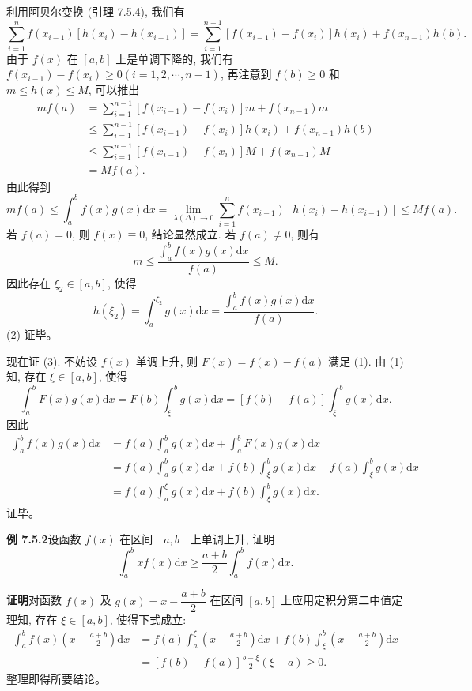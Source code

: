 \documentclass[UTF8,12pt,a4paper,fontset=fandol]{ctexart}
\begin{document}
利用阿贝尔变换 (引理 7.5.4), 我们有
\[
\sum_{i=1}^n f(x_{i-1})[h(x_i)-h(x_{i-1})]
=\sum_{i=1}^{n-1}[f(x_{i-1})-f(x_i)]h(x_i)+f(x_{n-1})h(b).
\]
由于 $f(x)$ 在 $[a,b]$ 上是单调下降的, 我们有 $f(x_{i-1})-f(x_i)\geq0(i=1,2,\cdots,n-1)$, 再注意到 $f(b)\geq0$ 和 $m\leq h(x)\leq M$, 可以推出
\[
\begin{aligned}
  mf(a)&=\sum_{i=1}^{n-1}[f(x_{i-1})-f(x_i)]m+f(x_{n-1})m\\
  &\leq\sum_{i=1}^{n-1}[f(x_{i-1})-f(x_i)]h(x_i)+f(x_{n-1})h(b)\\
  &\leq\sum_{i=1}^{n-1}[f(x_{i-1})-f(x_i)]M+f(x_{n-1})M\\
  &=Mf(a).
\end{aligned}
\]
由此得到
\[
  mf(a)\leq\int_a^b f(x)g(x)\mathrm dx
  =\lim_{\lambda(\Delta)\to0}\sum_{i=1}^n f(x_{i-1})[h(x_i)-h(x_{i-1})]\leq Mf(a).
\]
若 $f(a)=0$, 则 $f(x)\equiv0$, 结论显然成立. 若 $f(a)\neq0$, 则有
\[
  m\leq\frac{\int_a^b f(x)g(x)\mathrm dx}{f(a)}\leq M.
\]
因此存在 $\xi_2\in[a,b]$, 使得
\[
  h(\xi_2)=\int_a^{\xi_2}g(x)\mathrm dx
  =\frac{\int_a^b f(x)g(x)\mathrm dx}{f(a)}.
\]
(2) 证毕。

现在证 (3). 不妨设 $f(x)$ 单调上升, 则 $F(x)=f(x)-f(a)$ 满足 (1). 由 (1) 知, 存在 $\xi\in[a,b]$, 使得
\[
  \int_a^b F(x)g(x)\mathrm dx=F(b)\int_\xi^b g(x)\mathrm dx=[f(b)-f(a)]\int_\xi^b g(x)\mathrm dx.
\]
因此
\[
\begin{aligned}
  \int_a^b f(x)g(x)\mathrm dx
  &=f(a)\int_a^b g(x)\mathrm dx+\int_a^b F(x)g(x)\mathrm dx\\
  &=f(a)\int_a^b g(x)\mathrm dx+f(b)\int_\xi^b g(x)\mathrm dx
  -f(a)\int_\xi^b g(x)\mathrm dx\\
  &=f(a)\int_a^\xi g(x)\mathrm dx+f(b)\int_\xi^b g(x)\mathrm dx.
\end{aligned}
\]
证毕。

\noindent\textbf{例 7.5.2}\quad 设函数 $f(x)$ 在区间 $[a,b]$ 上单调上升, 证明
\[
  \int_a^b xf(x)\mathrm dx\geq\frac{a+b}{2}\int_a^b f(x)\mathrm dx.
\]

\noindent\textbf{证明}\quad 对函数 $f(x)$ 及 $g(x)=x-\dfrac{a+b}{2}$ 在区间 $[a,b]$ 上应用定积分第二中值定理知, 存在 $\xi\in[a,b]$, 使得下式成立:
\[
\begin{aligned}
  \int_a^b f(x)\left(x-\frac{a+b}{2}\right)\mathrm dx
  &=f(a)\int_a^\xi\left(x-\frac{a+b}{2}\right)\mathrm dx
  +f(b)\int_\xi^b\left(x-\frac{a+b}{2}\right)\mathrm dx\\
  &=[f(b)-f(a)]\frac{b-\xi}{2}(\xi-a)\geq0.
\end{aligned}
\]
整理即得所要结论。
\end{document}
